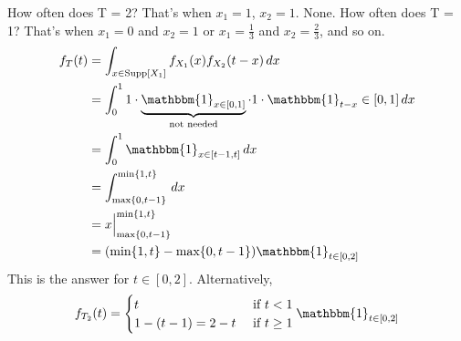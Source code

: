 \documentclass[12pt]{article}
\newcommand{\indicator}[1]{\mathbbm{1}_{#1}}
\renewcommand{\max}[1]{\text{max}\{#1\}}
\renewcommand{\min}[1]{\text{min}\{#1\}}
\begin{document}
How often does T = 2? That's when $x_1 = 1$, $x_2 = 1$. None. How often does T = 1? That's when $x_1 = 0$ and $x_2 = 1$ or $x_1 = \frac{1}{3}$ and $x_2 = \frac{2}{3}$, and so on. $$\begin{aligned} f_T(t) &= \int_{x \in \text{Supp}[X_1]} f_{X_1}(x)f_{X_2}(t - x) \, dx \\ 
&= \int_0^1 1 \cdot \underbrace{\indicator{x \in [0, 1]}}_{\text{not needed}} \cdot 1 \cdot \indicator{t - x} \in [0, 1] \, dx \\ &= \int_0^1 \indicator{x \in [t -1, t]} \, dx \\ &= \int_{\max{0, t - 1}}^{\min{1, t}} \, dx \\ &= x \Big|_{\max{0, t - 1}}^{\min{1, t}} \\ &= (\min{1, t} - \max{0, t - 1}) \indicator{t \in [0, 2]} \end{aligned} $$ This is the answer for $t \in [0, 2]$. Alternatively, $$f_{T_2}(t) = \begin{cases} t &\text{ if } t < 1 \\ 1 - (t - 1) = 2 -t &\text{ if } t \geq 1 \end{cases} \indicator{t \in [0, 2]} $$ 
\end{document}

